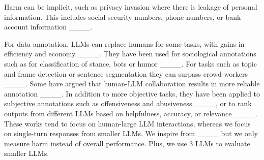 
Harm can be implicit, such as privacy invasion
where there is 
leakage of personal information. %
This includes social security numbers, phone numbers, or bank account information ____. 


For data annotation, LLMs
can %
replace humans for some tasks, %
with gains in efficiency and economy ____. They have been used for sociological annotations such as for classification of stance, bots or humor  ____. For tasks such as topic and frame detection or sentence segmentation they can surpass crowd-workers
____. Some have argued that human-LLM collaboration results in more reliable annotation ____. In addition to more objective tasks,
they have been applied to subjective annotations such as offensiveness and abusiveness ____, %
or to rank outputs from different LLMs based on helpfulness, accuracy, or relevance ____. These works tend to focus on human-large LLM interactions, whereas we focus on single-turn responses from smaller LLMs. We inspire from ____ but we only measure harm instead of overall performance. Plus, we use 3 LLMs to evaluate smaller LLMs.